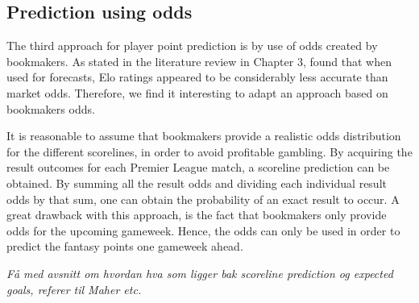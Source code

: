 \subsection{Prediction using odds}
The third approach for player point prediction is by use of odds created by bookmakers. As stated in the literature review in Chapter 3, \cite{Hvattum} found that when used for forecasts, Elo ratings appeared to be considerably less accurate than market odds. Therefore, we find it interesting to adapt an approach based on bookmakers odds.

It is reasonable to assume that bookmakers provide a realistic odds distribution for the different scorelines, in order to avoid profitable gambling. By acquiring the result outcomes for each Premier League match, a scoreline prediction can be obtained. By summing all the result odds and dividing each individual result odds by that sum, one can obtain the probability of an exact result to occur. A great drawback with this approach, is the fact that bookmakers only provide odds for the upcoming gameweek. Hence, the odds can only be used in order to predict the fantasy points one gameweek ahead. 

\newpar

\begin{comment}

\end{comment}

\textit{Få med avsnitt om hvordan hva som ligger bak scoreline prediction og expected goals, referer til Maher etc.}

\newpar


\newpar

